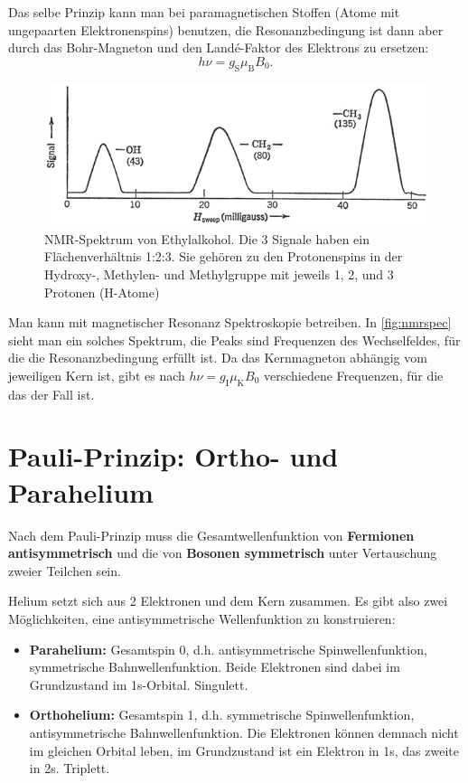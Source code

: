 Das selbe Prinzip kann man bei paramagnetischen Stoffen (Atome mit ungepaarten Elektronenspins) benutzen, die Resonanzbedingung ist dann aber durch das Bohr-Magneton und den Landé-Faktor des Elektrons zu ersetzen:
\begin{equation*}
	h\nu = g_\text{S}\mu_\text{B}B_0.
\end{equation*}
\begin{figure}
	\centering
	\includegraphics[width=.5\textwidth]{./img/nmrspec.jpg}
	\caption{NMR-Spektrum von Ethylalkohol. Die 3 Signale haben ein Flächenverhältnis 1:2:3. Sie gehören zu den Protonenspins in der Hydroxy-, Methylen- und Methylgruppe mit jeweils 1, 2, und 3 Protonen (H-Atome)}
	\label{fig:nmrspec}
\end{figure}
Man kann mit magnetischer Resonanz Spektroskopie betreiben.
In \autoref{fig:nmrspec} sieht man ein solches Spektrum, die Peaks sind Frequenzen des Wechselfeldes, für die die Resonanzbedingung erfüllt ist.
Da das Kernmagneton abhängig vom jeweiligen Kern ist, gibt es nach $h\nu = g_\text{I}\mu_\text{K}B_0$ verschiedene Frequenzen, für die das der Fall ist.

\section{Pauli-Prinzip: Ortho- und Parahelium}
Nach dem Pauli-Prinzip muss die Gesamtwellenfunktion von \textbf{Fermionen antisymmetrisch} und die von \textbf{Bosonen symmetrisch} unter Vertauschung zweier Teilchen sein.

Helium setzt sich aus 2 Elektronen und dem Kern zusammen.
Es gibt also zwei Möglichkeiten, eine antisymmetrische Wellenfunktion zu konstruieren:
\begin{itemize}
	\item \textbf{Parahelium:} Gesamtspin 0, d.h. antisymmetrische Spinwellenfunktion, symmetrische Bahnwellenfunktion.
	Beide Elektronen sind dabei im Grundzustand im 1s-Orbital. Singulett.
	\item \textbf{Orthohelium:} Gesamtspin 1, d.h. symmetrische Spinwellenfunktion, antisymmetrische Bahnwellenfunktion.
	Die Elektronen können demnach nicht im gleichen Orbital leben, im Grundzustand ist ein Elektron in 1s, das zweite in 2s. Triplett.
\end{itemize}

